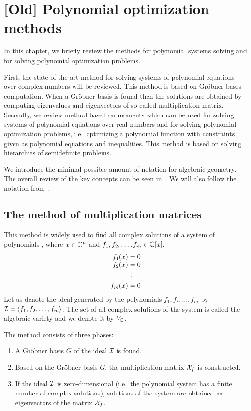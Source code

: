 \chapter{[Old] Polynomial optimization methods}
In this chapter, we briefly review the methods for polynomial systems solving and for solving polynomial optimization problems.

First, the state of the art method for solving systems of polynomial equations over complex numbers will be reviewed.
This method is based on Gr\"obner bases~\cite{Becker93} computation.
When a Gr\"obner basis is found then the solutions are obtained by computing eigenvalues and eigenvectors of so-called multiplication matrix.
Secondly, we review method based on moments which can be used for solving systems of polynomial equations over real numbers and for solving polynomial optimization problems, i.e.\ optimizing a polynomial function with constraints given as polynomial equations and inequalities.
This method is based on solving hierarchies of semidefinite problems.

We introduce the minimal possible amount of notation for algebraic geometry.
The overall review of the key concepts can be seen in~\cite{Cox-Little-Shea2015}.
We will also follow the notation from~\cite{Cox-Little-Shea2015}.

\section{The method of multiplication matrices}
This method is widely used to find all complex solutions of a system of polynomials , where $x\in\mathbb{C}^n$ and $f_1, f_2, \ldots, f_m\in\mathbb{C}[x]$.
\begin{align}
  \arraycolsep=1.4pt
  \begin{array}{rl}
    f_1(x) &= 0\\
    f_2(x) &= 0\\
    &\vdots\\
    f_m(x) &= 0
  \end{array}\labeleq{pol:mm:polynomialSystem}
\end{align}
Let us denote the ideal generated by the polynomials $f_1, f_2, \ldots, f_m$ by $\mathcal{I} = \langle f_1, f_2, \ldots, f_m\rangle$. The set of all complex solutions of the system  is called the algebraic variety and we denote it by $V_{\mathbb{C}}$.

The method consists of three phases:
\begin{enumerate}
  \item A Gr\"obner basis $G$ of the ideal $\mathcal{I}$ is found.
  \item Based on the Gr\"obner basis $G$, the multiplication matrix $\mathcal{X}_f$ is constructed.
  \item If the ideal $\mathcal{I}$ is zero-dimensional (i.e.\ the polynomial system has a finite number of complex solutions), solutions of the system  are obtained as eigenvectors of the matrix $\mathcal{X}_f$.
\end{enumerate}

